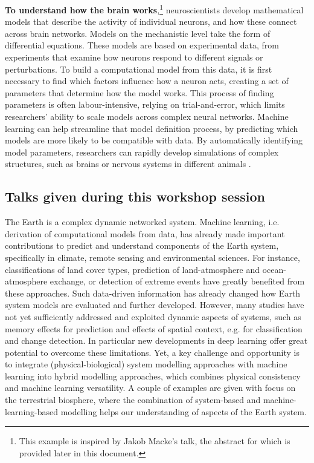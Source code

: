 \noindent\textbf{To understand how the brain works},\footnote{This example is
  inspired by Jakob Macke's talk, the abstract for which is provided
  later in this document.} neuroscientists develop mathematical models
that describe the activity of individual neurons, and how these connect
across brain networks. Models on the mechanistic level take the form of
differential equations. These models are based on experimental data,
from experiments that examine how neurons respond to different signals
or perturbations. To build a computational model from this data, it is
first necessary to find which factors influence how a neuron acts,
creating a set of parameters that determine how the model works. This
process of finding parameters is often labour-intensive, relying on
trial-and-error, which limits researchers' ability to scale models
across complex neural networks. Machine learning can help streamline
that model definition process, by predicting which models are more
likely to be compatible with data. By automatically identifying model
parameters, researchers can rapidly develop simulations of complex
structures, such as brains or nervous systems in different
animals \cite{Gonccalves-training20}.

\subsection{Talks given during this workshop session}

\license

The Earth is a complex dynamic networked system. Machine learning, i.e. derivation of computational models from data, has already made important contributions to predict and understand components of the Earth system, specifically in climate, remote sensing and environmental sciences. For instance, classifications of land cover types, prediction of land-atmosphere and ocean-atmosphere exchange, or detection of extreme events have greatly benefited from these approaches. Such data-driven information has already changed how Earth system models are evaluated and further developed. However, many studies have not yet sufficiently addressed and exploited dynamic aspects of systems, such as memory effects for prediction and effects of spatial context, e.g. for classification and change detection. In particular new developments in deep learning offer great potential to overcome these limitations. Yet, a key challenge and opportunity is to integrate (physical-biological) system modelling approaches with machine learning into hybrid modelling approaches, which combines physical consistency and machine learning versatility. A couple of examples are given with focus on the terrestrial biosphere, where the combination of system-based and machine-learning-based modelling helps our understanding of aspects of the Earth system.

